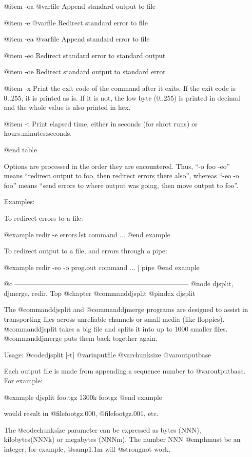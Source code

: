 @item -oa @var{file}
Append standard output to file

@item -e @var{file}
Redirect standard error to file

@item -ea @var{file}
Append standard error to file

@item -eo
Redirect standard error to standard output

@item -oe
Redirect standard output to standard error

@item -x
Print the exit code of the command after it exits.  If the exit code is
0..255, it is printed as is.  If it is not, the low byte (0..255) is
printed in decimal and the whole value is also printed in hex.

@item -t
Print elapsed time, either in seconds (for short runs) or
hours:minutes:seconds.

@end table

Options are processed in the order they are encountered.  Thus, ``-o foo
-eo'' means ``redirect output to foo, then redirect errors there also'',
whereas ``-eo -o foo'' means ``send errors to where output was going, then
move output to foo''.


Examples:

To redirect errors to a file:

@example
redir -e errors.lst command ...
@end example

To redirect output to a file, and errors through a pipe:

@example
redir -eo -o prog.out command ... | pipe
@end example

@c -----------------------------------------------------------------------------
@node djsplit, djmerge, redir, Top
@chapter @command{djsplit}
@pindex djsplit

The @command{djsplit} and @command{djmerge} programs are designed to assist in
transporting files across unreliable channels or small media (like
floppies).  @command{djsplit} takes a big file and splits it into up to 1000
smaller files.  @command{djmerge} puts them back together again.

Usage: @code{djsplit [-t] @var{inputfile} @var{chunksize} @var{outputbase}}

Each output file is made from appending a sequence number to
@var{outputbase}.  For example:

@example
djsplit foo.tgz 1300k footgz
@end example

would result in @file{footgz.000}, @file{footgz.001}, etc.

The @code{chunksize} parameter can be expressed as bytes (NNN),
kilobytes(NNNk) or megabytes (NNNm).  The number NNN @emph{must} be an
integer; for example, @samp{1.1m} will @strong{not} work.

